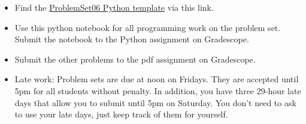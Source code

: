 \documentclass[12pt,letterpaper,noanswers]{exam}
\begin{document}
 \pdfpageheight 11in 
  \pdfpagewidth 8.5in

\begin{itemize}
    \itemsep0pt
    \item Find the \href{https://github.com/sarah1123/ScientificComputing-APMTH111/blob/main/2023Fall/PythonFiles/06_quadrature/ProblemSet06.ipynb}{ProblemSet06 Python template} via this link.
    \item Use this python notebook for all programming work on the problem set.  Submit the notebook to the Python assignment on Gradescope.
    \item Submit the other problems to the pdf assignment on Gradescope.
    \item Late work: Problem sets are due at noon on Fridays.  They are accepted until 5pm for all students without penalty.  In addition, you have three 29-hour late days that allow you to submit until 5pm on Saturday.  You don't need to ask to use your late days, just keep track of them for yourself.
\end{itemize}
\end{document}

